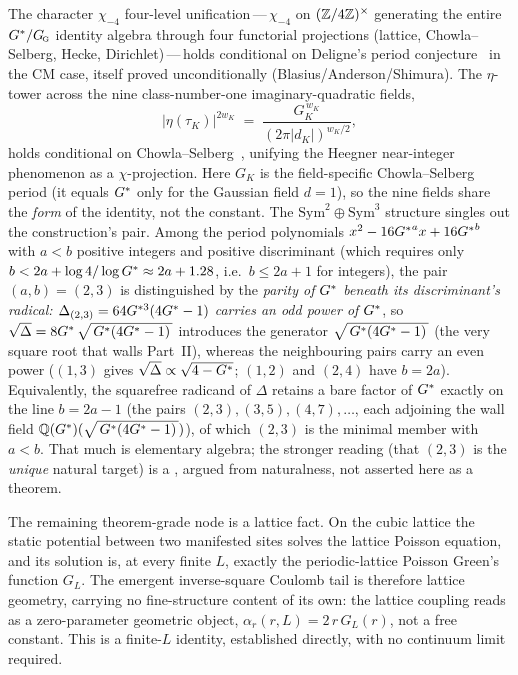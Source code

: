 %
The character $\chi_{-4}$ four-level unification\,---\,$\chi_{-4}$ on
$(\mathbb{Z}/4\mathbb{Z})^\times$ generating the entire $G^{*}/G_{\!\scriptscriptstyle\mathrm{G}}$ identity algebra through four
functorial projections (lattice, Chowla--Selberg, Hecke, Dirichlet)\,---\,holds
conditional on Deligne's period conjecture~\cite{deligne1979} in the CM case,
itself proved unconditionally (Blasius/Anderson/Shimura). The $\eta$-tower across
the nine class-number-one imaginary-quadratic fields,
\[ |\eta(\tau_K)|^{2w_K} \;=\; \frac{G_K^{\,w_K}}{(2\pi|d_K|)^{w_K/2}}, \]
holds conditional on Chowla--Selberg~\cite{chowlaSelberg1967}, unifying the
Heegner near-integer phenomenon as a $\chi$-projection. Here $G_K$ is the
field-specific Chowla--Selberg period (it equals $G^{*}$ only for the Gaussian
field $d=1$), so the nine fields share the \emph{form} of the identity, not
the constant. The
$\mathrm{Sym}^2\oplus\mathrm{Sym}^3$ structure singles out the construction's
pair. Among the period polynomials $x^2-16{G^{*}}^{a}x+16{G^{*}}^{b}$ with $a<b$
positive integers and positive discriminant (which requires only
$b<2a+\log 4/\log G^{*}\approx 2a+1.28$, i.e.\ $b\le 2a+1$ for integers), the pair
$(a,b)=(2,3)$ is distinguished by the \emph{parity of $G^{*}$ beneath its
discriminant's radical: $\Delta_{(2,3)}=64G^{*3}(4G^{*}-1)$ carries an odd power of
$G^{*}$}, so $\sqrt{\Delta}=8G^{*}\,\sqrt{\,G^{*}(4G^{*} - 1)\,}$ introduces the generator
$\sqrt{\,G^{*}(4G^{*} - 1)\,}$ (the very square root that walls Part~II), whereas the
neighbouring pairs carry an even power ($(1,3)$ gives
$\sqrt{\Delta}\propto\sqrt{4-G^{*}}$; $(1,2)$ and $(2,4)$ have $b=2a$). Equivalently,
the squarefree radicand of $\Delta$ retains a bare factor of $G^{*}$ exactly on the
line $b=2a-1$ (the pairs $(2,3),(3,5),(4,7),\dots$, each adjoining the wall
field $\mathbb{Q}(G^{*})(\sqrt{\,G^{*}(4G^{*} - 1)\,})$), of which $(2,3)$ is the minimal member with $a<b$.
That much is elementary algebra; the stronger reading (that $(2,3)$ is the
\emph{unique} natural target) is a , argued from
naturalness, not asserted here as a theorem.

 The remaining theorem-grade
node is a lattice fact. On the cubic lattice the static potential between two
manifested sites solves the lattice Poisson equation, and its solution is, at
every finite $L$, exactly the periodic-lattice Poisson Green's function
$G_L$. The emergent inverse-square Coulomb tail is therefore lattice geometry,
carrying no fine-structure content of its own: the lattice coupling reads as a
zero-parameter geometric object, $\alpha_r(r,L)=2\,r\,G_L(r)$, not a free
constant. This is a finite-$L$ identity, established directly, with no continuum
limit required.

